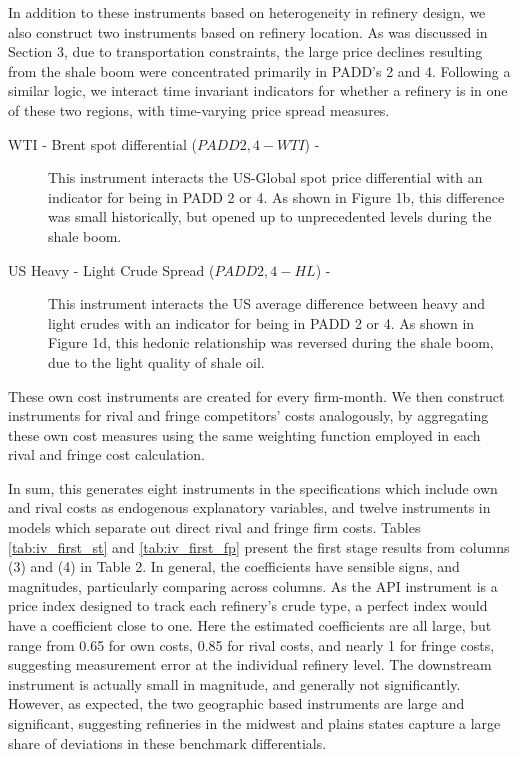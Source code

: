 \documentclass[12pt]{article}
\begin{document}
In addition to these instruments based on heterogeneity in refinery design, we also construct two instruments based on refinery location. As was discussed in Section 3, due to transportation constraints, the large price declines resulting from the shale boom were concentrated primarily in PADD's 2 and 4.  Following a similar logic, we interact time invariant indicators for whether a refinery is in one of these two regions, with time-varying price spread measures.

\begin{description}
  \item[WTI - Brent spot differential ($PADD 2,4-WTI$) -] This instrument interacts the US-Global spot price differential with an indicator for being in PADD 2 or 4. As shown in Figure 1b, this difference was small historically, but opened up to unprecedented levels during the shale boom.

  \item[US Heavy - Light Crude Spread ($PADD 2,4-HL$) -] This instrument interacts the US average difference between heavy and light crudes with an indicator for being in PADD 2 or 4. As shown in Figure 1d, this hedonic relationship was reversed during the shale boom, due to the light quality of shale oil.

\end{description}

These own cost instruments are created for every firm-month. We then construct instruments for rival and fringe competitors' costs analogously, by aggregating these own cost measures using the same weighting function employed in each rival and fringe cost calculation.

In sum, this generates eight instruments in the specifications which include own and rival costs as endogenous explanatory variables, and twelve instruments in models which separate out direct rival and fringe firm costs. Tables \ref{tab:iv_first_st} and \ref{tab:iv_first_fp} present the first stage results from columns (3) and (4) in Table 2. In general, the coefficients have sensible signs, and magnitudes, particularly comparing across columns. As the API instrument is a price index designed to track each refinery's crude type, a perfect index would have a coefficient close to one. Here the estimated coefficients are all large, but range from 0.65 for own costs, 0.85 for rival costs, and nearly 1 for fringe costs, suggesting measurement error at the individual refinery level. The downstream instrument is actually small in magnitude, and generally not significantly. However, as expected, the two geographic based instruments are large and significant, suggesting refineries in the midwest and plains states capture a large share of deviations in these benchmark differentials.
\end{document}
